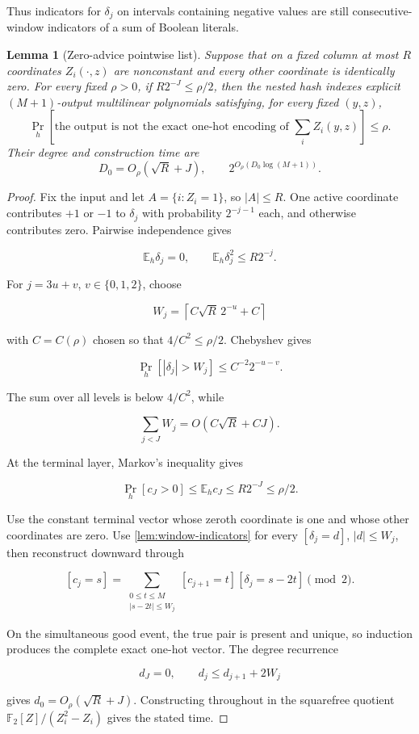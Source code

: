 \documentclass[11pt,letterpaper]{article}
\newcommand{\cref}[1]{\ref{#1}}
\newtheorem{lemma}[theorem]{Lemma}
\theoremstyle{definition}
\theoremstyle{remark}
\begin{document}
Thus indicators for \(\delta_j\) on intervals containing negative values
are still consecutive-window indicators of a sum of Boolean literals.

\begin{lemma}[Zero-advice pointwise list]
\label{lem:zero-advice-list}
Suppose that on a
fixed column at most \(R\) coordinates \(Z_i(\cdot,z)\) are nonconstant
and every other coordinate is identically zero. For every fixed
\(\rho>0\), if \(R2^{-J}\le\rho/2\), then the nested hash indexes explicit
\((M+1)\)-output multilinear polynomials satisfying, for every fixed
\((y,z)\), \[
\Pr_h\left[
\text{the output is not the exact one-hot encoding of }\sum_iZ_i(y,z)
\right]
\le\rho.
\] Their degree and construction time are \[
D_0=O_\rho(\sqrt R+J),
\qquad
2^{O_\rho(D_0\log(M+1))}.
\]
\end{lemma}

\begin{proof} Fix the input and let \(A=\{i:Z_i=1\}\), so \(|A|\le R\).
One active coordinate contributes \(+1\) or \(-1\) to \(\delta_j\) with
probability \(2^{-j-1}\) each, and otherwise contributes zero. Pairwise
independence gives

\[
\mathbb E_h\delta_j=0,
\qquad
\mathbb E_h\delta_j^2\le R2^{-j}.
\]

For \(j=3u+v\), \(v\in\{0,1,2\}\), choose

\[
W_j
{}={}
\left\lceil
C\sqrt R\,2^{-u}+C
\right\rceil
\]

with \(C=C(\rho)\) chosen so that \(4/C^2\le\rho/2\). Chebyshev gives

\[
\Pr_h[|\delta_j|>W_j]
\le
C^{-2}2^{-u-v}.
\]

The sum over all levels is below \(4/C^2\), while

\[
\sum_{j<J}W_j
{}={}
O(C\sqrt R+CJ).
\]

At the terminal layer, Markov's inequality gives

\[
\Pr_h[c_J>0]
\le
\mathbb E_hc_J
\le
R2^{-J}
\le
\rho/2.
\]

Use the constant terminal vector whose zeroth coordinate is one and
whose other coordinates are zero. Use
\cref{lem:window-indicators} for every \([\delta_j=d]\),
\(|d|\le W_j\), then reconstruct downward through

\[
[c_j=s]
{}={}
\sum_{\substack{0\le t\le M\\|s-2t|\le W_j}}
[c_{j+1}=t]
[\delta_j=s-2t]
\pmod2.
\]

On the simultaneous good event, the true pair is present and unique, so
induction produces the complete exact one-hot vector. The degree
recurrence

\[
d_J=0,
\qquad
d_j\le d_{j+1}+2W_j
\]

gives \(d_0=O_\rho(\sqrt R+J)\). Constructing throughout in the
squarefree quotient \(\mathbb F_2[Z]/(Z_i^2-Z_i)\) gives the stated
time. \end{proof}
\end{document}
